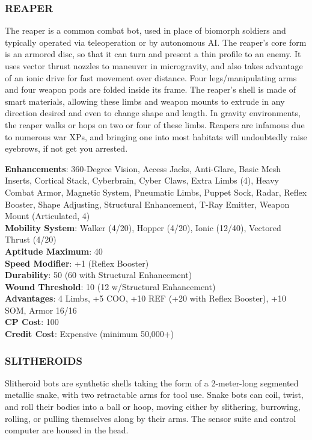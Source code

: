 \subsubsection{REAPER}
The reaper is a common combat bot, used in place of biomorph soldiers and
typically operated via teleoperation or by autonomous AI. The reaper’s core
form is an armored disc, so that it can turn and present a thin profile to an
enemy. It uses vector thrust nozzles to maneuver in microgravity, and also
takes advantage of an ionic drive for fast movement over distance.  Four
legs/manipulating arms and four weapon pods are folded inside its frame. The
reaper’s shell is made of smart materials, allowing these limbs and weapon
mounts to extrude in any direction desired and even to change shape and
length. In gravity environments, the reaper walks or hops on two or four of
these limbs.  Reapers are infamous due to numerous war XPs, and bringing one
into most habitats will undoubtedly raise eyebrows, if not get you arrested.

\textbf{Enhancements}: 360-Degree Vision, Access Jacks, Anti-Glare, Basic Mesh Inserts, Cortical Stack, Cyberbrain, Cyber Claws, Extra Limbs (4), Heavy Combat Armor, Magnetic System, Pneumatic Limbs, Puppet Sock, Radar, Reflex Booster, Shape Adjusting, Structural Enhancement, T-Ray Emitter, Weapon Mount (Articulated, 4) \\
\textbf{Mobility System}: Walker (4/20), Hopper (4/20), Ionic (12/40), Vectored Thrust (4/20) \\
\textbf{Aptitude Maximum}: 40 \\
\textbf{Speed Modifier}: +1 (Reflex Booster) \\
\textbf{Durability}: 50 (60 with Structural Enhancement) \\
\textbf{Wound Threshold}: 10 (12 w/Structural Enhancement) \\
\textbf{Advantages}: 4 Limbs, +5 COO, +10 REF (+20 with Reflex Booster), +10 SOM, Armor 16/16 \\
\textbf{CP Cost}: 100 \\
\textbf{Credit Cost}: Expensive (minimum 50,000+)

\subsubsection{SLITHEROIDS}
Slitheroid bots are synthetic shells taking the form of a 2-meter-long
segmented metallic snake, with two retractable arms for tool use. Snake bots
can coil, twist, and roll their bodies into a ball or hoop, moving either by
slithering, burrowing, rolling, or pulling themselves along by their arms. The
sensor suite and control computer are housed in the head.

